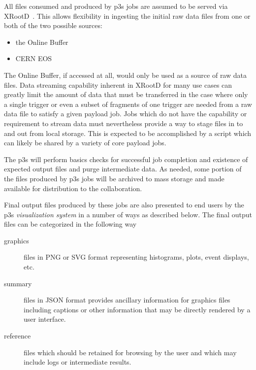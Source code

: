 \documentclass[pdftex,12pt,letter]{article}
\begin{document}
All files consumed and produced by p3s jobs are assumed to be served
via XRootD~\cite{xrootd}.  This allows flexibility in ingesting the
initial raw data files from one or both of the two possible sources:
\begin{itemize}
\item the Online Buffer
\item CERN EOS~\cite{eos}
\end{itemize}
The Online Buffer, if accessed at all, would only be used as a source
of raw data files.  
Data streaming capability inherent in XRootD for many use cases
can greatly limit the amount of data that must be
transferred in the case where only a single trigger or even a subset
of fragments of one trigger are needed from a raw data file to satisfy
a given payload job.  Jobs which do not have the capability or
requirement to stream data must nevertheless provide a way to stage files
in to and out from local storage.  This is expected to be accomplished
by a script which can likely be shared by a variety of core payload
jobs.

The p3s will perform basics checks for successful job completion
and existence of expected output files and purge intermediate data.
As needed, some portion of the files produced by p3s jobs will be
archived to mass storage and made available for distribution to the
collaboration.

Final output files produced by these jobs are also presented to end
users by the p3s \textit{visualization system} in a number of ways as
described below.  The final output files can be categorized in the
following way

\begin{description}
\item[graphics] files in PNG or SVG format representing histograms, plots, event displays, etc.
\item[summary] files in JSON format provides ancillary information for graphics files including captions or other information that may be directly rendered by a user interface.
\item[reference] files which should be retained for browsing by the user and which may include logs or intermediate results. 
\end{description}
\end{document}

